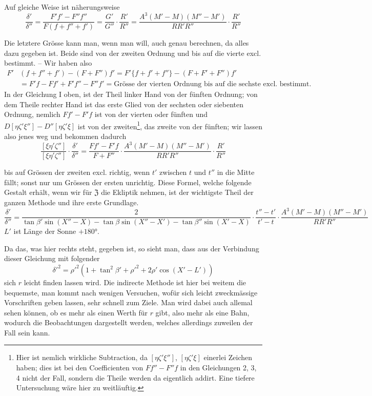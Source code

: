 \documentclass[10pt,a4paper]{article}
\begin{document}
Auf gleiche Weise ist näherungsweise
\[
\frac{\delta'}{\delta''} = \frac{F'f' - F''f''}{F(f + f'' + f')} = \frac{G'}{G''} \cdot \frac{R'}{R''} = \frac{A^3(M' - M)(M'' - M')}{R R' R''} \cdot \frac{R'}{R''}
\]

Die letztere Grösse kann man, wenn man will, auch genau berechnen, da alles dazu gegeben ist. Beide sind von der zweiten Ordnung und bis auf die vierte excl. bestimmt. -- Wir haben also
\begin{align*}
F'&(f + f'' + f') - (F + F'')f' = F'\{f + f' + f''\} - (F + F' + F'')f' \\
&= F'f - Ff' + F'f'' - F''f' = \text{Grösse der vierten Ordnung bis auf die sechste excl. bestimmt.}
\end{align*}
In der Gleichung I oben, ist der Theil linker Hand von der fünften Ordnung; von dem Theile rechter Hand ist das erste Glied von der sechsten oder siebenten Ordnung, nemlich $Ff' - F'f$ ist von der vierten oder fünften und $D[\eta\zeta'\xi''] - D''[\eta\zeta'\xi]$ ist von der zweiten\footnote{Hier ist nemlich wirkliche Subtraction, da $[\eta\zeta'\xi'']$, $[\eta\zeta'\xi]$ einerlei Zeichen haben; dies ist bei den Coefficienten von $Ff'' - F''f$ in den Gleichungen 2, 3, 4 nicht der Fall, sondern die Theile werden da eigentlich addirt. Eine tiefere Untersuchung wäre hier zu weitläuftig.}, das zweite von der fünften; wir lassen also jenes weg und bekommen dadurch
\[
\frac{[\xi\eta'\zeta'']}{[\xi\eta'\zeta'']} \cdot \frac{\delta'}{\delta''} = \frac{Ff' - F'f}{F + F''} \cdot \frac{A^3(M' - M)(M'' - M')}{R R' R''} \cdot \frac{R'}{R''}
\]

\clearpage
\noindent
bis auf Grössen der zweiten excl. richtig, wenn $t'$ zwischen $t$ und $t''$ in die Mitte fällt; sonst nur um Grössen der ersten unrichtig. Diese Formel, welche folgende Gestalt erhält, wenn wir für $\mathfrak{Z}$ die Ekliptik nehmen, ist der wichtigste Theil der ganzen Methode und ihre erste Grundlage.
\begin{equation*}
\frac{\delta'}{\delta''} = \frac{2}{\tan\beta'\sin(X'' - X) - \tan\beta\sin(X'' - X') - \tan\beta''\sin(X' - X)} \cdot \frac{t'' - t'}{t' - t} \cdot \frac{A^3(M' - M)(M'' - M')}{R R' R''}
\end{equation*}
$L'$ ist Länge der Sonne $+ 180°$.

Da das, was hier rechts steht, gegeben ist, so sieht man, dass aus der Verbindung dieser Gleichung mit folgender
\[
\delta'^2 = \rho'^2(1 + \tan^2\beta' + \rho'^2 + 2\rho'\cos(X' - L'))
\]
sich $r$ leicht finden lassen wird. Die indirecte Methode ist hier bei weitem die bequemste, man kommt nach wenigen Versuchen, wofür sich leicht zweckmässige Vorschriften geben lassen, sehr schnell zum Ziele. Man wird dabei auch allemal sehen können, ob es mehr als einen Werth für $r$ gibt, also mehr als eine Bahn, wodurch die Beobachtungen dargestellt werden, welches allerdings zuweilen der Fall sein kann.
\end{document}
